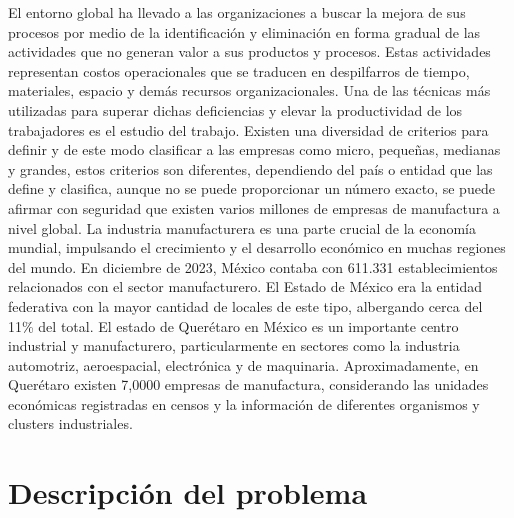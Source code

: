     El entorno global ha llevado a las organizaciones a buscar la mejora de sus procesos por medio de la identificación y eliminación en forma gradual de las actividades que no generan valor a sus productos y procesos. Estas actividades representan costos operacionales que se traducen en despilfarros de tiempo, materiales, espacio y demás recursos organizacionales. Una de las técnicas más utilizadas para superar dichas deficiencias y elevar la productividad de los trabajadores es el estudio del trabajo. \cite{castiblanco2016que}
    Existen una diversidad de criterios para definir y de este modo clasificar a las empresas como micro, pequeñas, medianas y grandes, estos criterios son diferentes, dependiendo del país o entidad que las define y clasifica, aunque no se puede proporcionar un número exacto, se puede afirmar con seguridad que existen varios millones de empresas de manufactura a nivel global. La industria manufacturera es una parte crucial de la economía mundial, impulsando el crecimiento y el desarrollo económico en muchas regiones del mundo.\cite{saavedra2008caracterizacion}
    En diciembre de 2023, México contaba con 611.331 establecimientos relacionados con el sector manufacturero. El Estado de México era la entidad federativa con la mayor cantidad de locales de este tipo, albergando cerca del 11\% del total. El estado de Querétaro en México es un importante centro industrial y manufacturero, particularmente en sectores como la industria automotriz, aeroespacial, electrónica y de maquinaria. Aproximadamente, en Querétaro existen 7,0000 empresas de manufactura, considerando las unidades económicas registradas en censos y la información de diferentes organismos y clusters industriales. 
        
    
    \section{Descripción del problema}

    
